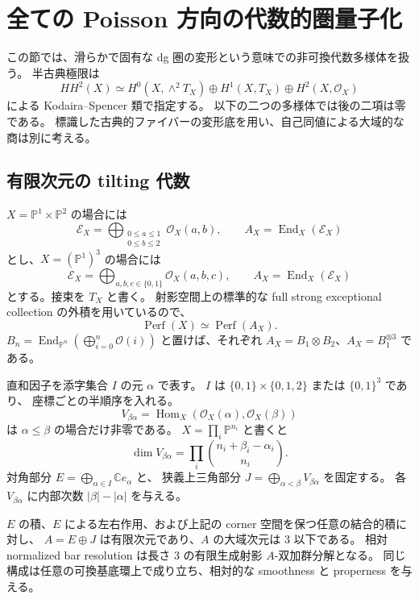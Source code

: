 \section{全ての Poisson 方向の代数的圏量子化}
\label{sec:tilting-quantization}

この節では、滑らかで固有な dg 圏の変形という意味での非可換代数多様体を扱う。
半古典極限は
\[
 HH^2(X)\simeq
 H^0(X,\wedge^2T_X)\oplus H^1(X,T_X)\oplus H^2(X,\mathcal O_X)
\]
による Kodaira--Spencer 類で指定する。
以下の二つの多様体では後の二項は零である。
標識した古典的ファイバーの変形底を用い、自己同値による大域的な商は別に考える。

\subsection{有限次元の tilting 代数}

$X=\mathbb P^1\times\mathbb P^2$ の場合には
\[
 \mathcal E_X=\bigoplus_{\substack{0\leq a\leq1\\0\leq b\leq2}}\mathcal O_X(a,b),
 \qquad
 A_X=\operatorname{End}_X(\mathcal E_X)
\]
とし、$X=(\mathbb P^1)^3$ の場合には
\[
 \mathcal E_X=\bigoplus_{a,b,c\in\{0,1\}}\mathcal O_X(a,b,c),
 \qquad
 A_X=\operatorname{End}_X(\mathcal E_X)
\]
とする。接束を $T_X$ と書く。
射影空間上の標準的な full strong exceptional collection の外積を用いているので、
\[
 \operatorname{Perf}(X)\simeq\operatorname{Perf}(A_X).
\]
$B_n=\operatorname{End}_{\mathbb P^n}
(\bigoplus_{i=0}^{n}\mathcal O(i))$ と置けば、それぞれ
$A_X=B_1\otimes B_2$、$A_X=B_1^{\otimes3}$ である。

直和因子を添字集合 $I$ の元 $\alpha$ で表す。
$I$ は $\{0,1\}\times\{0,1,2\}$ または $\{0,1\}^3$ であり、
座標ごとの半順序を入れる。
\[
 V_{\beta\alpha}
 =\operatorname{Hom}_X(\mathcal O_X(\alpha),\mathcal O_X(\beta))
\]
は $\alpha\leq\beta$ の場合だけ非零である。
$X=\prod_i\mathbb P^{n_i}$ と書くと
\[
 \dim V_{\beta\alpha}
 =\prod_i\binom{n_i+\beta_i-\alpha_i}{n_i}.
\]
対角部分 $E=\bigoplus_{\alpha\in I}\mathbb C e_\alpha$ と、
狭義上三角部分 $J=\bigoplus_{\alpha<\beta}V_{\beta\alpha}$ を固定する。
各 $V_{\beta\alpha}$ に内部次数 $|\beta|-|\alpha|$ を与える。

\begin{lemma}\label{lem:directed-quantization}
$E$ の積、$E$ による左右作用、および上記の corner 空間を保つ任意の結合的積に対し、
$A=E\oplus J$ は有限次元であり、$A$ の大域次元は $3$ 以下である。
相対 normalized bar resolution は長さ $3$ の有限生成射影 $A$-双加群分解となる。
同じ構成は任意の可換基底環上で成り立ち、相対的な smoothness と properness を与える。
\end{lemma}

